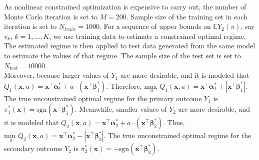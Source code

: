 \documentclass{article}
\newcommand{\itl}{\intercal}
\newcommand{\bs}{ \boldsymbol}
\newcommand{\mb}{\mathbb}
\newcommand{\txt}{\text}
\newcommand{\tsgn}{\txt{sgn}}
\begin{document}
As nonlinear constrained optimization is expensive to carry out, the number of Monte Carlo iteration is set to $M = 200$. Sample size of the training set in each iteration is set to $N_{train} = 1000$. For a sequence of upper bounds on $\mb{E}Y_2(\pi)$, say $v_{k}$, $k = 1, . . . , K$, we use training data to estimate a constrained optimal regime. The estimated regime is then applied to test data generated from the same model to estimate the values of that regime. The sample size of the test set is set to $N_{test} = 10000$. \\

Moreover, because  larger values of $Y_1$ are more desirable, and it is modeled that $Q_{1}(\bs{x}, a) = \bs{x}^{\itl}\bs{\alpha}^*_1 + a \cdot (\bs{x}^{\itl}\bs{\beta}^*_1)$. Therefore, $\underset{a}{\text{max }} Q_1(\bs{x}, a) = \bs{x}^{\itl}\bs{\alpha}^*_1 + | \bs{x}^{\itl}\bs{\beta}^*_1 |$. The true unconstrained optimal regime for the primary outcome $Y_1$ is $\pi^{*}_{1}(\bs{x}) = \tsgn(\bs{x}^{\itl}\bs{\beta}^*_1)$.  Meanwhile, smaller values of $Y_2$ are more desirable, and it is modeled that $ Q_2(\bs{x}, a) = \bs{x}^{\itl}\bs{\alpha}^*_2 + a\cdot(\bs{x}^{\itl}\bs{\beta}^{*}_{2})$. Thus, $\underset{a}{\text{min }} Q_2(\bs{x}, a) = \bs{x}^{\itl}\bs{\alpha}^{*}_{2} - | \bs{x}^{\itl}\bs{\beta}^{*}_{2} |$. The true unconstrained optimal regime for the secondary outcome $Y_2$ is $\pi^{*}_{2}(\bs{x}) = -\tsgn(\bs{x}^{\itl}\bs{\beta}^{*}_{2})$.\\
\end{document}
